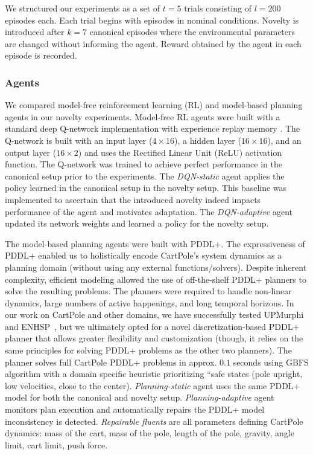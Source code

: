 \documentclass[letterpaper]{article} %
\begin{document}
We structured our experiments as a set of $t=5$ trials consisting of $l=200$ episodes each. Each trial begins with episodes in nominal conditions. Novelty is introduced after $k=7$ canonical episodes where the environmental parameters are changed without informing the agent. Reward obtained by the agent in each episode is recorded.

\subsubsection{Agents}
We compared model-free reinforcement learning (RL) and model-based planning agents in our novelty experiments. Model-free RL agents were built with a standard deep Q-network implementation with experience replay memory \cite{mnih2013playing}. The Q-network is built with an input layer ($4 \times 16$), a hidden layer ($16 \times 16$), and an output layer ($16 \times 2$) and uses the Rectified Linear Unit (ReLU) activation function. The Q-network was trained to achieve perfect performance in the canonical setup prior to the experiments. The \emph{DQN-static} agent applies the policy learned in the canonical setup in the novelty setup. This baseline was implemented to ascertain that the introduced novelty indeed impacts performance of the agent and motivates adaptation. The \emph{DQN-adaptive} agent updated its network weights and learned a policy for the novelty setup.

The model-based planning agents were built with PDDL+. The expressiveness of PDDL+ enabled us to holistically encode CartPole's system dynamics as a planning domain (without using any external functions/solvers). Despite inherent complexity, efficient modeling allowed the use of off-the-shelf PDDL+ planners to solve the resulting problems. The planners were required to handle non-linear dynamics, large numbers of active happenings, and long temporal horizons. In our work on CartPole and other domains, we have successfully tested UPMurphi~\cite{della2009upmurphi} and ENHSP~\cite{scala2016interval}, but we ultimately opted for a novel discretization-based PDDL+ planner that allows greater flexibility and customization (though, it relies on the same principles for solving PDDL+ problems as the other two planners). The planner solves full CartPole PDDL+ problems in approx. $0.1$ seconds using GBFS algorithm with a domain specific heuristic prioritizing ``safe states (pole upright, low velocities, close to the center). \emph{Planning-static} agent uses the same PDDL+ model for both the canonical and novelty setup. \emph{Planning-adaptive} agent monitors plan execution and automatically repairs the PDDL+ model inconsistency is detected. \emph{Repairable fluents} are all parameters defining CartPole dynamics: mass of the cart, mass of the pole, length of the pole, gravity, angle limit, cart limit, push force.
\end{document}
